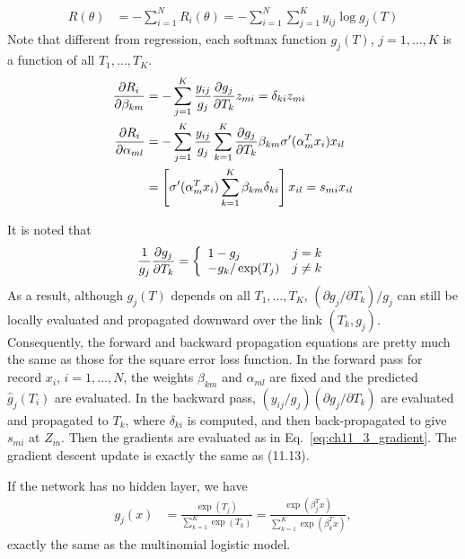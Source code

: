 \begin{exercise}
  \begin{align}
    R(\theta) &= -\sum_{i=1}^NR_i(\theta) = -\sum_{i=1}^N\sum_{j=1}^Ky_{ij}\log
    g_j(T)
  \end{align}
  Note that different from regression, each softmax function $g_j(T)$,
  $j=1,\ldots,K$ is a function of all $T_1,\ldots, T_K$.
  \begin{subequations}
    \begin{align}
      \pdv{R_i}{\beta_{km}} & = -\sum_{j=1}^{K}\frac{y_{ij}}{g_j}
      \pdv{g_j}{T_k} z_{mi} = \delta_{ki}z_{mi} \\
      \pdv{R_i}{\alpha_{ml}} & = -\sum_{j=1}^{K}\frac{y_{ij}}{g_j} 
      \sum_{k=1}^K\pdv{g_j}{T_k}\beta_{km}\sigma'(\alpha_m^Tx_i)x_{il} \notag \\
      & = \left[\sigma'(\alpha_m^Tx_i)\sum_{k=1}^K\beta_{km}\delta_{ki}
      \right]x_{il} = s_{mi}x_{il}
    \end{align}
    \label{eq:ch11_3_gradient}
  \end{subequations}
  
  It is noted that 
  \begin{align}
    \frac{1}{g_j}\pdv{g_j}{T_k} = 
    \left\{
      \begin{array}{ll}
        1-g_j & j=k \\
        -g_k/\exp(T_j) & j\not=k
      \end{array}
    \right.
  \end{align}
  As a result, although $g_j(T)$ depends on all $T_1,\ldots, T_K$,
  $(\partial g_j / \partial T_k) / g_j$ can still be locally evaluated and
  propagated downward over the link $(T_k, g_j)$. Consequently, the forward and
  backward propagation equations are pretty much the same as those for the
  square error loss function. In the forward pass for record $x_i$,
  $i=1,\ldots,N$, the weights $\beta_{km}$ and $\alpha_{ml}$ are fixed and the
  predicted $\hat{g}_j(T_i)$ are evaluated. In the backward pass,
  $(y_{ij}/g_j)(\partial g_j/\partial T_k)$ are evaluated and propagated to
  $T_k$, where $\delta_{ki}$ is computed, and then back-propagated to give
  $s_{mi}$ at $Z_m$. Then the gradients are evaluated as in
  Eq.~\eqref{eq:ch11_3_gradient}. The gradient descent update is exactly the
  same as (11.13).
\end{exercise}

\begin{exercise}
  If the network has no hidden layer, we have
  \begin{align}
    g_j(x) & = \frac{\exp(T_j)}{\sum_{k=1}^K\exp(T_k)} =
    \frac{\exp(\beta_j^Tx)}{\sum_{k=1}^K\exp(\beta_k^Tx)},
  \end{align}
  exactly the same as the multinomial logistic model.
\end{exercise}

\begin{exercise}[(Program)]
\end{exercise}

\begin{exercise}[(Program)]
\end{exercise}

\begin{exercise}[(Program)]
\end{exercise}